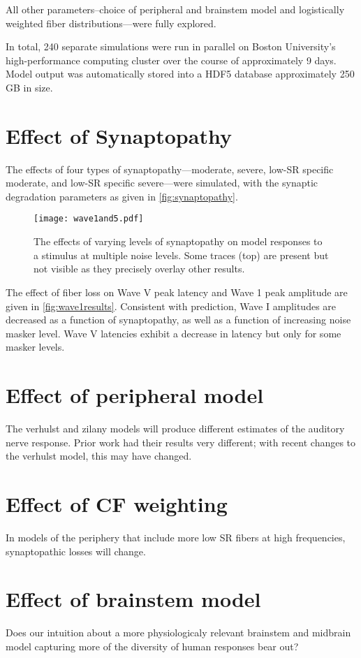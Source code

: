 All other parameters--choice of peripheral and brainstem model and logistically weighted fiber distributions---were fully explored.

In total, 240 separate simulations were run in parallel on Boston University's high-performance computing cluster over the course of approximately 9 days.  Model output was automatically stored into a HDF5 database approximately 250 GB in size.


\section{Effect of Synaptopathy} %
\label{sec:effect_of_synaptopathy}
The effects of four types of synaptopathy---moderate, severe, low-SR specific moderate, and low-SR specific severe---were simulated, with the synaptic degradation parameters as given in \autoref{fig:synaptopathy}. 

\begin{figure}[htbp]
	\centering
	\texttt{[image: wave1and5.pdf]}
	\caption[Effects of Synaptopathy]{The effects of varying levels of synaptopathy on model responses to a stimulus at multiple noise levels.  Some traces (top) are present but not visible as they precisely overlay other results.}
	\label{fig:wave1results}
\end{figure}

The effect of fiber loss on Wave V peak latency and Wave 1 peak amplitude are given in \autoref{fig:wave1results}.  Consistent with prediction, Wave I amplitudes are decreased as a function of synaptopathy, as well as a function of increasing noise masker level.  Wave V latencies exhibit a decrease in latency but only for some masker levels.  

\section{Effect of peripheral model} %
\label{sec:effect_of_peripheral_model}
The verhulst and zilany models will produce different estimates of the auditory nerve response. Prior work had their results very different; with recent changes to the verhulst model, this may have changed.


\section{Effect of CF weighting} %
\label{sec:effect_of_cf_weighting}
In models of the periphery that include more low SR fibers at high frequencies, synaptopathic losses will change.

\section{Effect of brainstem model} %
\label{sec:effect_of_brainstem_model}
Does our intuition about a more physiologicaly relevant brainstem and midbrain model capturing more of the diversity of human responses bear out? 
